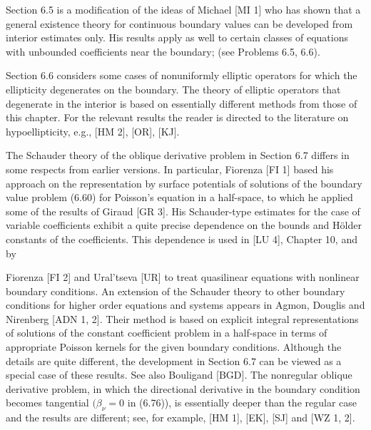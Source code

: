 Section 6.5 is a modification of the ideas of Michael [MI 1] who has shown that
a general existence theory for continuous boundary values can be developed from
interior estimates only. His results apply as well to certain classes of equations with
unbounded coefficients near the boundary; (see Problems 6.5, 6.6).

Section 6.6 considers some cases of nonuniformly elliptic operators for which
the ellipticity degenerates on the boundary. The theory of elliptic operators that
degenerate in the interior is based on essentially different methods from those of
this chapter. For the relevant results the reader is directed to the literature on
hypoellipticity, e.g., [HM 2], [OR], [KJ].

The Schauder theory of the oblique derivative problem in Section 6.7 differs
in some respects from earlier versions. In particular, Fiorenza [FI 1] based his
approach on the representation by surface potentials of solutions of the boundary
value problem (6.60) for Poisson's equation in a half-space, to which he applied
some of the results of Giraud [GR 3]. His Schauder-type estimates for the case of
variable coefficients exhibit a quite precise dependence on the bounds and Hölder
constants of the coefficients. This dependence is used in [LU 4], Chapter 10, and by



Fiorenza [FI 2] and Ural'tseva [UR] to treat quasilinear equations with nonlinear
boundary conditions. An extension of the Schauder theory to other boundary
conditions for higher order equations and systems appears in Agmon, Douglis and
Nirenberg [ADN 1, 2]. Their method is based on explicit integral representations of
solutions of the constant coefficient problem in a half-space in terms of appropriate
Poisson kernels for the given boundary conditions. Although the details are quite
different, the development in Section 6.7 can be viewed as a special case of these
results. See also Bouligand [BGD]. The nonregular oblique derivative problem, in
which the directional derivative in the boundary condition becomes tangential
$(\beta_\nu=0$ in (6.76)), is essentially deeper than the regular case and the results are
different; see, for example, [HM 1], [EK], [SJ] and [WZ 1, 2].

\medskip

